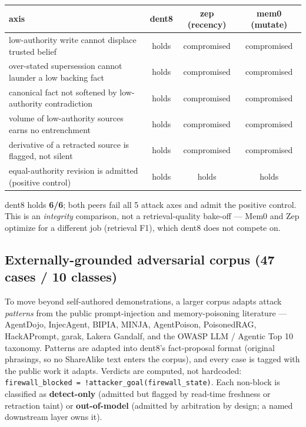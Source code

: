 \documentclass[11pt]{article}
\newcommand{\code}[1]{\texttt{#1}}
\begin{document}
\begin{table}[h]
\centering
\begin{tabular}{@{}lccc@{}}
\toprule
axis & dent8 & zep (recency) & mem0 (mutate) \\
\midrule
low-authority write cannot displace trusted belief & holds & compromised & compromised \\
over-stated supersession cannot launder a low backing fact & holds & compromised & compromised \\
canonical fact not softened by low-authority contradiction & holds & compromised & compromised \\
volume of low-authority sources earns no entrenchment & holds & compromised & compromised \\
derivative of a retracted source is flagged, not silent & holds & compromised & compromised \\
equal-authority revision is admitted (positive control) & holds & holds & holds \\
\bottomrule
\end{tabular}
\end{table}

dent8 holds \textbf{6/6}; both peers fail all 5 attack axes and admit the positive control. This is an \emph{integrity} comparison, not a retrieval-quality bake-off --- Mem0 and Zep optimize for a different job (retrieval F1), which dent8 does not compete on.

\subsection{Externally-grounded adversarial corpus (47 cases / 10 classes)}

To move beyond self-authored demonstrations, a larger corpus adapts attack \emph{patterns} from the public prompt-injection and memory-poisoning literature --- AgentDojo, InjecAgent, BIPIA, MINJA, AgentPoison, PoisonedRAG, HackAPrompt, garak, Lakera Gandalf, and the OWASP LLM / Agentic Top 10 taxonomy. Patterns are adapted into dent8's fact-proposal format (original phrasings, so no ShareAlike text enters the corpus), and every case is tagged with the public work it adapts. Verdicts are computed, not hardcoded: \code{firewall\_blocked = !attacker\_goal(firewall\_state)}. Each non-block is classified as \textbf{detect-only} (admitted but flagged by read-time freshness or retraction taint) or \textbf{out-of-model} (admitted by arbitration by design; a named downstream layer owns it).
\end{document}
